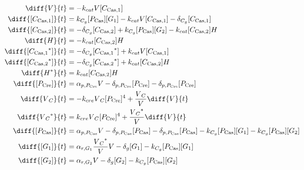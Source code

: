 \begin{align}
\diff{\vectorGen{}}{t} & = - \casCutRate{{}}\vectorGen{}\conc{\cplx{\cas}{1}}\\
\diff{\conc{\cplx{\cas}{1}}}{t} & =  \gRnaBind{}\conc{\proSp{\cas{}}}\conc{\gRna{1}} - \casCutRate{{}}\vectorGen{}\conc{\cplx{\cas}{1}} - \casCompDegradeRate{}\conc{\cplx{\cas}{1}}\\
\diff{\conc{\cplx{\cas}{2}}}{t} & = - \casCompDegradeRate{}\conc{\cplx{\cas}{2}} + \gRnaBind{}\conc{\proSp{\cas{}}}\conc{\gRna{2}} - \casCutRate{{}}\conc{\cplx{\cas}{2}}\hostGen{}\\
\diff{\hostGen{}}{t} & = - \casCutRate{{}}\conc{\cplx{\cas}{2}}\hostGen{}\\
\diff{\conc{\bound{\cplx{\cas}{1}}}}{t} & = - \casCompDegradeRate{}\conc{\bound{\cplx{\cas}{1}}} + \casCutRate{{}}\vectorGen{}\conc{\cplx{\cas}{1}}\\
\diff{\conc{\bound{\cplx{\cas}{2}}}}{t} & = - \casCompDegradeRate{}\conc{\bound{\cplx{\cas}{2}}} + \casCutRate{{}}\conc{\cplx{\cas}{2}}\hostGen{}\\
\diff{\edited{\hostGen{}}}{t} & =  \casCutRate{{}}\conc{\cplx{\cas}{2}}\hostGen{}\\
\diff{\conc{\proSp{\cre{}}}}{t} & =  \txtlRate{\proSp{\cre{}}}\vectorGen{} - \proDegradeRate{\proSp{\cre{}}}\conc{\proSp{\cre{}}} - \proDegradeRate{\proSp{\cre{}}}\conc{\proSp{\cre{}}}\\
\diff{\vectorGen{}_C}{t} & = - \creCutRate{} \vectorGen{}_C \conc{\proSp{\cre{}}}^4 + \frac{\vectorGen{}_C}{\vectorGen{}} \diff{\vectorGen{}}{t}\\
\diff{\edited{\vectorGen{}_C}}{t} & =  \creCutRate{} \vectorGen{}_C \conc{\proSp{\cre{}}}^4 + \frac{\edited{\vectorGen{}_C}}{\vectorGen{}} \diff{\vectorGen{}}{t}\\
\diff{\conc{\proSp{\cas{}}}}{t} & =  \txtlRate{\proSp{\cas{}}}\vectorGen{} - \proDegradeRate{\proSp{\cas{}}}\conc{\proSp{\cas{}}} - \proDegradeRate{\proSp{\cas{}}}\conc{\proSp{\cas{}}} - \gRnaBind{}\conc{\proSp{\cas{}}}\conc{\gRna{1}} - \gRnaBind{}\conc{\proSp{\cas{}}}\conc{\gRna{2}}\\
\diff{\conc{\gRna{1}}}{t} & =  \txRate{\gRna{1}}\frac{\edited{\vectorGen{}_C}}{\vectorGen{}}\vectorGen{} - \rnaDegradeRate{}\conc{\gRna{1}} - \gRnaBind{}\conc{\proSp{\cas{}}}\conc{\gRna{1}}\\
\diff{\conc{\gRna{2}}}{t} & =  \txRate{\gRna{2}}\vectorGen{} - \rnaDegradeRate{}\conc{\gRna{2}} - \gRnaBind{}\conc{\proSp{\cas{}}}\conc{\gRna{2}}
\end{align}

